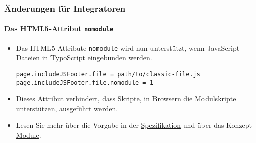 
\begin{frame}[fragile]
	\frametitle{Änderungen für Integratoren}
	\framesubtitle{Das HTML5-Attribut \texttt{nomodule}}

	\lstset{basicstyle=\tiny\ttfamily}

	\begin{itemize}
		\item Das HTML5-Attribute \texttt{nomodule} wird nun unterstützt, wenn JavaScript-Dateien in TypoScript eingebunden werden.
\begin{lstlisting}
page.includeJSFooter.file = path/to/classic-file.js
page.includeJSFooter.file.nomodule = 1
\end{lstlisting}

		\item Dieses Attribut verhindert, dass Skripte, in Browsern die Modulskripte unterstützen, ausgeführt werden.

		\item Lesen Sie mehr über die Vorgabe in der
			\href{https://html.spec.whatwg.org/multipage/scripting.html#attr-script-nomodule}{Spezifikation}
			und über das Konzept
			\href{https://hacks.mozilla.org/2015/08/es6-in-depth-modules/}{Module}.

	\end{itemize}


\end{frame}


